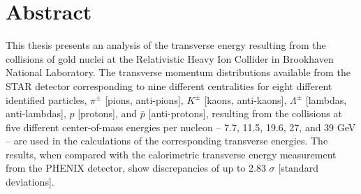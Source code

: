 \chapter*{Abstract}\label{ch:abstract}

This thesis presents an analysis of the transverse energy resulting from the collisions of gold nuclei at the Relativistic Heavy Ion Collider in Brookhaven National Laboratory. The transverse momentum distributions available from the STAR detector corresponding to nine different centralities for eight different identified particles, $\pi^\pm$ [pions, anti-pions], $K^\pm$ [kaons, anti-kaons], $\Lambda^\pm$ [lambdas, anti-lambdas], $p$ [protons], and $\bar{p}$ [anti-protons], resulting from the collisions at five different center-of-mass energies per nucleon -- 7.7, 11.5, 19.6, 27, and 39 GeV -- are used in the calculations of the corresponding transverse energies. The results, when compared with the calorimetric transverse energy measurement from the PHENIX detector, show discrepancies of up to 2.83 $\sigma$ [standard deviations].
